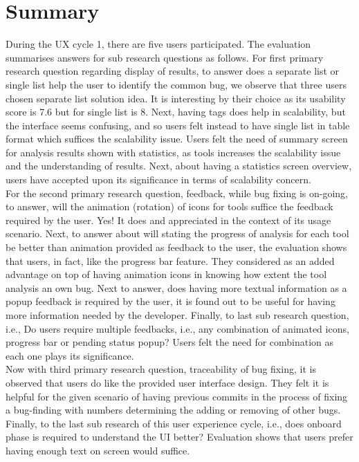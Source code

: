 \section{Summary}

During the UX cycle 1, there are five users participated. The evaluation summarises answers for sub research questions as follows. For first primary research question regarding display of results, to answer does a separate list or single list help the user to identify the common bug, we observe that three users chosen separate list solution idea. It is interesting by their choice as its usability score is 7.6 but for single list is 8. Next, having tags does help in scalability, but the interface seems confusing, and so users felt instead to have single list in table format which suffices the scalability issue. Users felt the need of summary screen for analysis results shown with statistics, as tools increases the scalability issue and the understanding of results. Next, about having a statistics screen overview, users have accepted upon its significance in terms of scalability concern. \\
   
For the second primary research question, feedback, while bug fixing is on-going, to answer, will the animation (rotation) of icons for tools suffice the feedback required by the user. Yes! It does and appreciated in the context of its usage scenario. Next, to answer about will stating the progress of analysis for each tool be better than animation provided as feedback to the user, the evaluation shows that users, in fact, like the progress bar feature.  They considered as an added advantage on top of having animation icons in knowing how extent the tool analysis an own bug. Next to answer, does having more textual information as a popup feedback is required by the user, it is found out to be useful for having more information needed by the developer. Finally, to last sub research question, i.e., Do users require multiple feedbacks, i.e., any combination of animated icons, progress bar or pending status popup? Users felt the need for combination as each one plays its significance. \\

Now with third primary research question, traceability of bug fixing, it is observed that users do like the provided user interface design. They felt it is helpful for the given scenario of having previous commits in the process of fixing a bug-finding with numbers determining the adding or removing of other bugs. Finally, to the last sub research of this user experience cycle, i.e., does onboard phase is required to understand the UI better? Evaluation shows that users prefer having enough text on screen would suffice. \\

